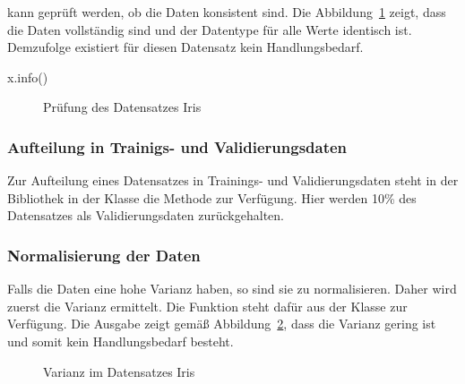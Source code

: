 \medskip


\medskip

kann geprüft werden, ob die Daten konsistent sind. Die Abbildung~\ref{TensorFlowIrisInfo} zeigt, dass die Daten vollständig sind und der Datentype für alle Werte identisch ist. Demzufolge existiert für diesen Datensatz kein Handlungsbedarf.

\medskip

x.info()

\medskip

\begin{figure}[H]
	\caption{Prüfung des Datensatzes Iris}\label{TensorFlowIrisInfo}
\end{figure}


\subsubsection{Aufteilung in Trainigs- und Validierungsdaten}

Zur Aufteilung eines Datensatzes  in Trainings- und Validierungsdaten steht in der Bibliothek  in der Klasse  die Methode  zur Verfügung. Hier werden 10\% des Datensatzes als Validierungsdaten zurückgehalten.

\medskip


\medskip

\subsubsection{Normalisierung der Daten}

Falls die Daten eine hohe Varianz haben, so sind sie zu normalisieren. Daher wird zuerst die Varianz ermittelt. Die Funktion  steht dafür aus der Klasse  zur Verfügung. Die Ausgabe zeigt gemäß Abbildung~\ref{TensorFlowIrisVar}, dass die Varianz gering ist und somit kein Handlungsbedarf besteht.

\medskip


\medskip


\begin{figure}[H]
	\caption{Varianz im Datensatzes Iris}\label{TensorFlowIrisVar}
\end{figure}

